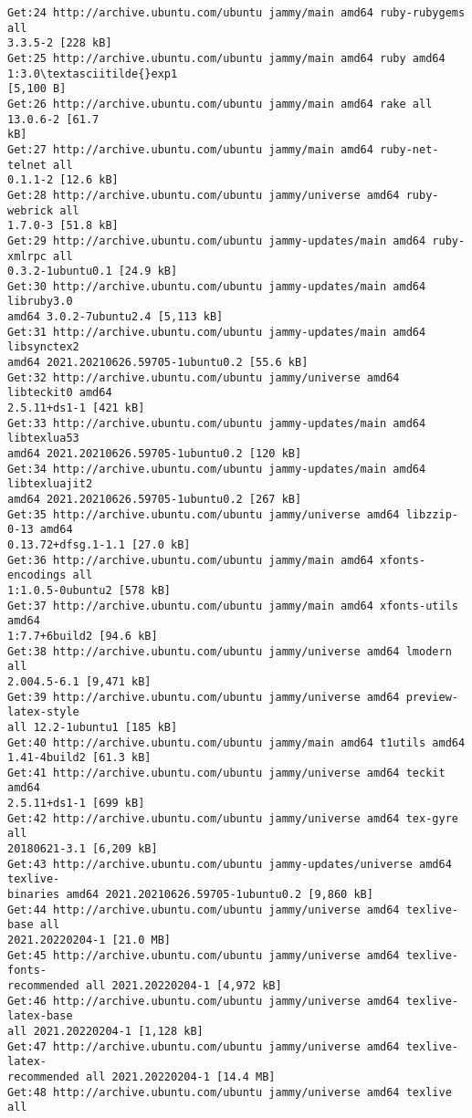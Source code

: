 \documentclass[11pt]{article}
\begin{document}
\begin{Verbatim}[commandchars=\\\{\}]
Get:24 http://archive.ubuntu.com/ubuntu jammy/main amd64 ruby-rubygems all
3.3.5-2 [228 kB]
Get:25 http://archive.ubuntu.com/ubuntu jammy/main amd64 ruby amd64 1:3.0\textasciitilde{}exp1
[5,100 B]
Get:26 http://archive.ubuntu.com/ubuntu jammy/main amd64 rake all 13.0.6-2 [61.7
kB]
Get:27 http://archive.ubuntu.com/ubuntu jammy/main amd64 ruby-net-telnet all
0.1.1-2 [12.6 kB]
Get:28 http://archive.ubuntu.com/ubuntu jammy/universe amd64 ruby-webrick all
1.7.0-3 [51.8 kB]
Get:29 http://archive.ubuntu.com/ubuntu jammy-updates/main amd64 ruby-xmlrpc all
0.3.2-1ubuntu0.1 [24.9 kB]
Get:30 http://archive.ubuntu.com/ubuntu jammy-updates/main amd64 libruby3.0
amd64 3.0.2-7ubuntu2.4 [5,113 kB]
Get:31 http://archive.ubuntu.com/ubuntu jammy-updates/main amd64 libsynctex2
amd64 2021.20210626.59705-1ubuntu0.2 [55.6 kB]
Get:32 http://archive.ubuntu.com/ubuntu jammy/universe amd64 libteckit0 amd64
2.5.11+ds1-1 [421 kB]
Get:33 http://archive.ubuntu.com/ubuntu jammy-updates/main amd64 libtexlua53
amd64 2021.20210626.59705-1ubuntu0.2 [120 kB]
Get:34 http://archive.ubuntu.com/ubuntu jammy-updates/main amd64 libtexluajit2
amd64 2021.20210626.59705-1ubuntu0.2 [267 kB]
Get:35 http://archive.ubuntu.com/ubuntu jammy/universe amd64 libzzip-0-13 amd64
0.13.72+dfsg.1-1.1 [27.0 kB]
Get:36 http://archive.ubuntu.com/ubuntu jammy/main amd64 xfonts-encodings all
1:1.0.5-0ubuntu2 [578 kB]
Get:37 http://archive.ubuntu.com/ubuntu jammy/main amd64 xfonts-utils amd64
1:7.7+6build2 [94.6 kB]
Get:38 http://archive.ubuntu.com/ubuntu jammy/universe amd64 lmodern all
2.004.5-6.1 [9,471 kB]
Get:39 http://archive.ubuntu.com/ubuntu jammy/universe amd64 preview-latex-style
all 12.2-1ubuntu1 [185 kB]
Get:40 http://archive.ubuntu.com/ubuntu jammy/main amd64 t1utils amd64
1.41-4build2 [61.3 kB]
Get:41 http://archive.ubuntu.com/ubuntu jammy/universe amd64 teckit amd64
2.5.11+ds1-1 [699 kB]
Get:42 http://archive.ubuntu.com/ubuntu jammy/universe amd64 tex-gyre all
20180621-3.1 [6,209 kB]
Get:43 http://archive.ubuntu.com/ubuntu jammy-updates/universe amd64 texlive-
binaries amd64 2021.20210626.59705-1ubuntu0.2 [9,860 kB]
Get:44 http://archive.ubuntu.com/ubuntu jammy/universe amd64 texlive-base all
2021.20220204-1 [21.0 MB]
Get:45 http://archive.ubuntu.com/ubuntu jammy/universe amd64 texlive-fonts-
recommended all 2021.20220204-1 [4,972 kB]
Get:46 http://archive.ubuntu.com/ubuntu jammy/universe amd64 texlive-latex-base
all 2021.20220204-1 [1,128 kB]
Get:47 http://archive.ubuntu.com/ubuntu jammy/universe amd64 texlive-latex-
recommended all 2021.20220204-1 [14.4 MB]
Get:48 http://archive.ubuntu.com/ubuntu jammy/universe amd64 texlive all

\end{Verbatim}
\end{document}
